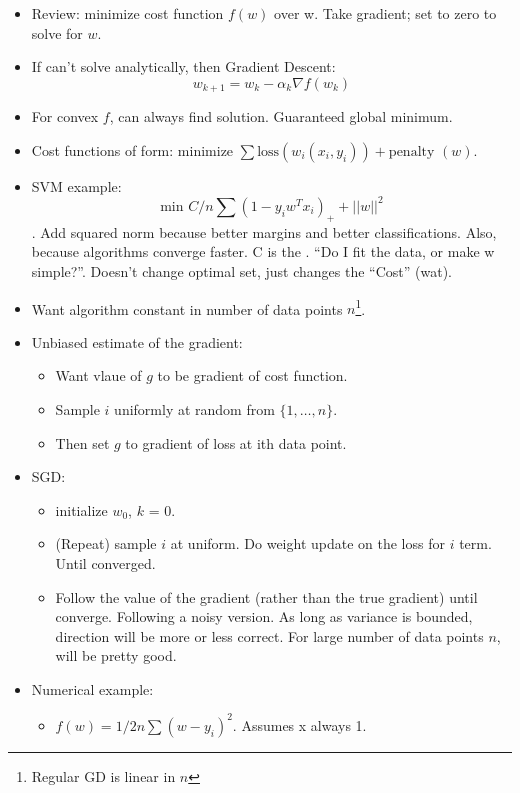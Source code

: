 \documentclass[12pt]{article}
\begin{document}
\begin{itemize}
	\item Review: minimize cost function $f(w)$ over w. Take gradient; set to zero to solve for $w$.
	\item If can't solve analytically, then Gradient Descent:
		\begin{equation}
		w_{k+1}= w_k - \alpha_k \nabla f(w_k)
		\end{equation}
	\item For convex $f$, can always find solution. Guaranteed global minimum.
	\item Cost functions of form: $\text{minimize }\sum \text{loss}(w_i(x_i, y_i)) + \text{penalty }(w)$.
	\item SVM example: \[\text{min } C/n \sum (1 - y_i w^T x_i)_+ + ||w||^2 \]. Add squared norm because better margins and better classifications. Also, because algorithms converge faster. C is the . ``Do I fit the data, or make w simple?''. Doesn't change optimal set, just changes the ``Cost'' (wat).
	\item Want algorithm constant in number of data points $n$\footnote{Regular GD is linear in $n$}.
	\item Unbiased estimate of the gradient:
	\begin{itemize}
		\item Want  vlaue of $g$ to be gradient of cost function.
		\item Sample $i$ uniformly at random from $\{1, \ldots, n\}$.
		\item Then set $g$ to gradient of loss at ith data point.
	\end{itemize}
	\item SGD:
	\begin{itemize}
		\item initialize $w_0$, $k$ = 0.
		\item (Repeat) sample $i$ at uniform. Do weight update on the loss for $i$ term. Until converged.
		\item Follow the  value of the gradient (rather than the true gradient) until converge. Following a noisy version. As long as variance is bounded, direction will be more or less correct. For large number of data points $n$, will be pretty good.
	\end{itemize}
	\item Numerical example:
	\begin{itemize}
		\item $f(w) = 1/2n \sum (w - y_i)^2$. Assumes x always 1.

\end{itemize}
\end{itemize}
\end{document}

